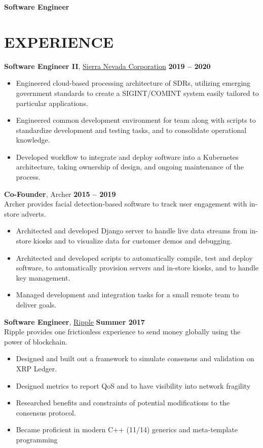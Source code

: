 \documentclass[letterpaper, 10pt, centered]{res} %
\begin{document}
\begin{resume}
\centerline{\textbf{\huge Software Engineer}}
\parbox{\textwidth}{}

\section{EXPERIENCE}
\textbf{Software Engineer II}, \href{https://www.sncorp.com}{Sierra Nevada Corporation} \hfill \textbf{2019 -- 2020}
\begin{itemize}[noitemsep]
	\item Engineered cloud-based processing architecture of SDRs, utilizing emerging government standards to create a SIGINT/COMINT system easily tailored to particular applications.
	\item Engineered common development environment for team along with scripts to standardize development and testing tasks, and to consolidate operational knowledge.
	\item Developed workflow to integrate and deploy software into a Kubernetes architecture, taking ownership of design, and ongoing maintenance of the process.
\end{itemize}
\vspace{-6pt}

\textbf{Co-Founder}, Archer \hfill \textbf{2015 -- 2019} \\
Archer provides facial detection-based software to track user engagement with in-store adverts.
\begin{itemize}[noitemsep]
	\item Architected and developed Django server to handle live data streams from in-store kiosks and to visualize data for customer demos and debugging.
	\item Architected and developed scripts to automatically compile, test and deploy software, to automatically provision servers and in-store kiosks, and to handle key management.
	\item Managed development and integration tasks for a small remote team to deliver goals.
\end{itemize}
\vspace{-6pt}

\textbf{Software Engineer}, \href{https://ripple.com/}{Ripple} \hfill \textbf{Summer 2017} \\
Ripple provides one frictionless experience to send money globally using the power of blockchain.
\begin{itemize}[noitemsep]
	\item Designed and built out a framework to simulate consensus and validation on XRP Ledger.
	\item Designed metrics to report QoS and  to have visibility into network fragility
	\item Researched benefits and constraints of potential modifications to the consensus protocol.
	\item Became proficient in modern C++ (11/14) generics and meta-template programming
\end{itemize}
\vspace{-6pt}


\end{resume}
\end{document}
